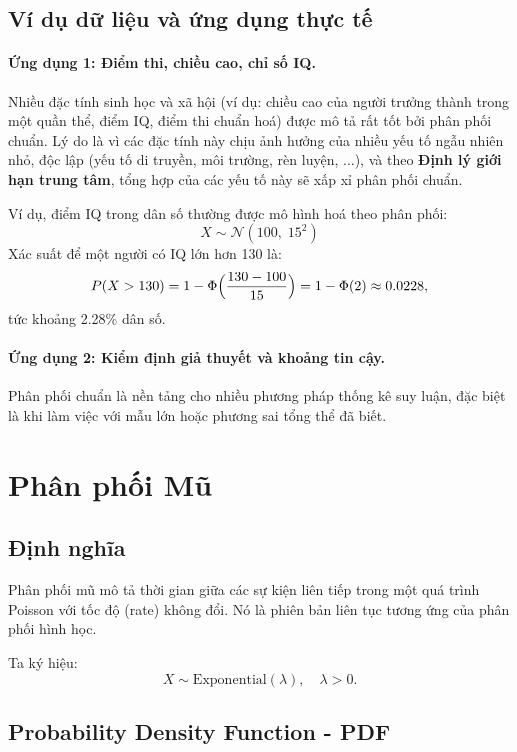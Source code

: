 \documentclass[a4paper,12pt]{article}
\begin{document}
\subsection{Ví dụ dữ liệu và ứng dụng thực tế }

\paragraph{Ứng dụng 1: Điểm thi, chiều cao, chỉ số IQ.}  
Nhiều đặc tính sinh học và xã hội (ví dụ: chiều cao của người trưởng thành trong một quần thể, điểm IQ, điểm thi chuẩn hoá) được mô tả rất tốt bởi phân phối chuẩn.  
Lý do là vì các đặc tính này chịu ảnh hưởng của nhiều yếu tố ngẫu nhiên nhỏ, độc lập (yếu tố di truyền, môi trường, rèn luyện, ...), và theo \textbf{Định lý giới hạn trung tâm}, tổng hợp của các yếu tố này sẽ xấp xỉ phân phối chuẩn.

Ví dụ, điểm IQ trong dân số thường được mô hình hoá theo phân phối:
\[
X \sim \mathcal{N}(100,\;15^2)
\]
Xác suất để một người có IQ lớn hơn 130 là:
\[
P(X > 130) = 1 - \Phi\Bigl(\frac{130 - 100}{15}\Bigr) 
= 1 - \Phi(2) \approx 0.0228,
\]
tức khoảng 2.28\% dân số.

\paragraph{Ứng dụng 2: Kiểm định giả thuyết và khoảng tin cậy.}  
Phân phối chuẩn là nền tảng cho nhiều phương pháp thống kê suy luận, đặc biệt là khi làm việc với mẫu lớn hoặc phương sai tổng thể đã biết.  


\section{Phân phối Mũ}

\subsection{Định nghĩa}

Phân phối mũ mô tả thời gian giữa các sự kiện liên tiếp trong một quá trình Poisson với tốc độ (rate) không đổi.  
Nó là phiên bản liên tục tương ứng của phân phối hình học.  

Ta ký hiệu:
\[
X \sim \mathrm{Exponential}(\lambda), \quad \lambda>0.
\]

\subsection{Probability Density Function - PDF}
\end{document}
